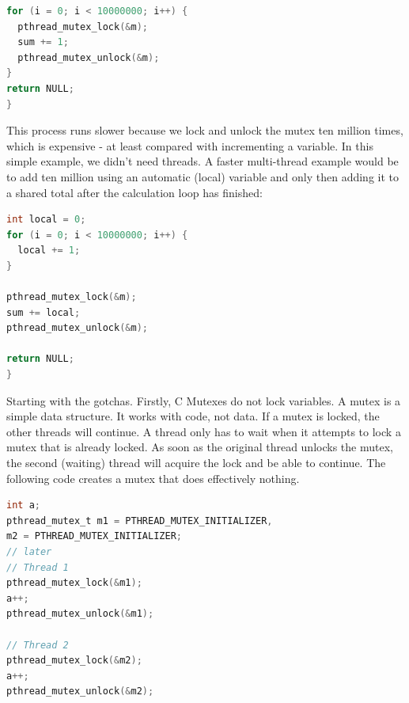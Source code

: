 \begin{lstlisting}[language=C]
for (i = 0; i < 10000000; i++) {
  pthread_mutex_lock(&m);
  sum += 1;
  pthread_mutex_unlock(&m);
}
return NULL;
}
\end{lstlisting}

This process runs slower because we lock and unlock the mutex ten million times, which is expensive - at least compared with incrementing a variable.
In this simple example, we didn't need threads.
A faster multi-thread example would be to add ten million using an automatic (local) variable and only then adding it to a shared total after the calculation loop has finished:

\begin{lstlisting}[language=C]
int local = 0;
for (i = 0; i < 10000000; i++) {
  local += 1;
}

pthread_mutex_lock(&m);
sum += local;
pthread_mutex_unlock(&m);

return NULL;
}
\end{lstlisting}


Starting with the gotchas.
Firstly, C Mutexes do not lock variables.
A mutex is a simple data structure.
It works with code, not data.
If a mutex is locked, the other threads will continue.
A thread only has to wait when it attempts to lock a mutex that is already locked.
As soon as the original thread unlocks the mutex, the second (waiting) thread will acquire the lock and be able to continue.
The following code creates a mutex that does effectively nothing.

\begin{lstlisting}[language=C]
int a;
pthread_mutex_t m1 = PTHREAD_MUTEX_INITIALIZER,
m2 = PTHREAD_MUTEX_INITIALIZER;
// later
// Thread 1
pthread_mutex_lock(&m1);
a++;
pthread_mutex_unlock(&m1);

// Thread 2
pthread_mutex_lock(&m2);
a++;
pthread_mutex_unlock(&m2);
\end{lstlisting}

